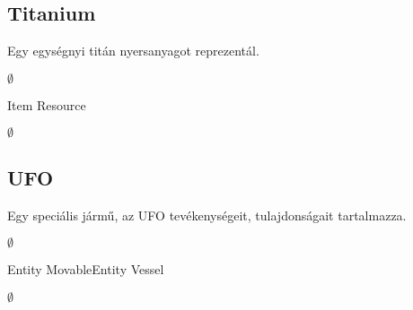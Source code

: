 \documentclass[../../projlab]{subfiles}
\begin{document}
\subsection{Titanium}
\begin{class-template-responsibility}
 Egy egységnyi titán nyersanyagot reprezentál.
\end{class-template-responsibility}
\begin{class-template-interface}
$\emptyset$
\end{class-template-interface}
\begin{class-template-baseclass}
Item \baseclass Resource
\end{class-template-baseclass}
\begin{class-template-attribute}
\item[] $\emptyset$
\end{class-template-attribute}
\begin{class-template-method}
\end{class-template-method}


\subsection{UFO}
\begin{class-template-responsibility}
Egy speciális jármű, az UFO tevékenységeit, tulajdonságait tartalmazza.
\end{class-template-responsibility}
\begin{class-template-interface}
$\emptyset$
\end{class-template-interface}
\begin{class-template-baseclass}
Entity \baseclass MovableEntity \baseclass Vessel
\end{class-template-baseclass}
\begin{class-template-attribute}
\item[] $\emptyset$
\end{class-template-attribute}
\begin{class-template-method}
\end{class-template-method}
\end{document}
